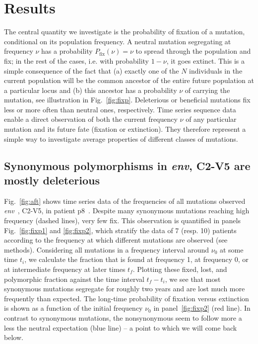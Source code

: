 \documentclass[rmp, twocolumn]{revtex4}
\newcommand{\FIG}[1]{Fig.~\ref{fig:#1}}
\newcommand{\env}{\textit{env}}
\begin{document}
\section{Results}

The central quantity we investigate is the probability of fixation of a
mutation, conditional on its population frequency.  A neutral mutation
segregating at frequency $\nu$ has a probability $P_\text{fix}(\nu) = \nu$ to
spread through the population and fix; in the rest of the cases, i.e. with
probability $1-\nu$, it goes extinct. This is a simple consequence of the fact
that (a) exactly one of the $N$ individuals in the current population will be
the common ancestor of the entire future population at a particular locus and
(b) this ancestor has a probability $\nu$ of carrying the mutation, see
illustration in \FIG{fixp}.  Deleterious or beneficial mutations fix less or
more often than neutral ones, respectively. Time series sequence data enable a
direct observation of both the current frequency $\nu$ of any particular
mutation and its future fate (fixation or extinction). They therefore represent
a simple way to investigate average properties of different classes of
mutations. 

\subsection{Synonymous polymorphisms in \env, C2-V5 are mostly deleterious}

\FIG{aft} shows time series data of the frequencies of all mutations observed
\env~, C2-V5, in patient p8~\citep{shankarappa_consistent_1999}. Despite many
synonymous mutations reaching high frequency (dashed lines), very few fix. This
observation is quantified in panels \FIG{fixp1} and \ref{fig:fixp2}, which
stratify the data of 7 (resp. 10) patients according to the frequency at which
different mutations are observed (see methods). Considering all mutations in a
frequency interval around $\nu_0$ at some time $t_i$, we calculate the fraction
that is found at frequency 1, at frequency 0, or at intermediate frequency at
later times $t_f$. Plotting these fixed, lost, and polymorphic fraction against
the time interval $t_f-t_i$, we see that most synonymous mutations segregate for
roughly two years and are lost much more frequently than expected. The long-time
probability of fixation versus extinction is shown as a function of the initial
frequency $\nu_0$ in panel~\ref{fig:fixp2} (red line). In contrast to synonymous
mutations, the nonsynonymous seem to follow more a less the neutral expectation
(blue line) -- a point to which we will come back below. 
\end{document}

